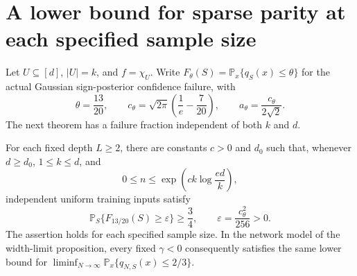 \section{A lower bound for sparse parity at each specified sample size}
\label{sec:sparse-gaussian}
Let $U\subseteq[d]$, $|U|=k$, and $f=\chi_U$. Write
$F_\theta(S)=\mathbb P_x\{q_S(x)\le\theta\}$ for the actual
Gaussian sign-posterior confidence failure, with
\[
 \theta=\frac{13}{20},\qquad
 c_\theta=\sqrt{2\pi}\left(\frac1e-\frac7{20}\right),\qquad
 a_\theta=\frac{c_\theta}{2\sqrt2}.
\]
The next theorem has a failure fraction independent of both $k$ and $d$.

\begin{theorem}
\label{thm:sparse-gaussian}
For each fixed depth $L\ge2$, there are constants $c>0$ and $d_0$
such that, whenever $d\ge d_0$, $1\le k\le d$, and
\[
 0\le n\le\exp\!\left(c k\log\frac{ed}{k}\right),
\]
independent uniform training inputs satisfy
\[
 \mathbb P_S\{F_{13/20}(S)\ge\varepsilon\}\ge\frac34,
 \qquad \varepsilon=\frac{c_\theta^2}{256}>0.
\]
The assertion holds for each specified sample size. In the network model
of the width-limit proposition, every fixed $\gamma<0$ consequently
satisfies the same lower bound for
$\liminf_{N\to\infty}\mathbb P_x\{q_{N,S}(x)\le2/3\}$.
\end{theorem}


